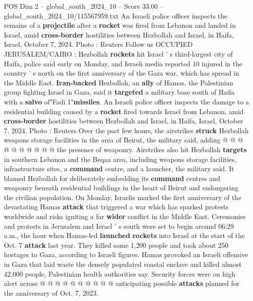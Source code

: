 \begin{textsample}{POS Dim 2 – global\_south\_2024\_10 – Score 33.00 – global\_south\_2024\_10/115567959.txt}  \label{ex:f2_pos_026}
An Israeli police officer inspects the remains of a \textbf{projectile} after a \textbf{rocket} was fired from Lebanon and landed in Israel, amid \textbf{cross-border} hostilities between Hezbollah and Israel, in Haifa, Israel, October 7, 2024.
Photo : Reuters Follow us OCCUPIED JERUSALEM/CAIRO : Hezbollah \textbf{rockets} hit Israel ' s third-largest city of Haifa, police said early on Monday, and Israeli media reported 10 injured in the country ' s north on the first anniversary of the Gaza war, which has spread in the Middle East. \textbf{Iran-backed} Hezbollah, an \textbf{ally} of Hamas, the Palestinian group fighting Israel in Gaza, said it \textbf{targeted} a military base south of Haifa with a \textbf{salvo} of"Fadi 1"\textbf{missiles}.
An Israeli police officer inspects the damage to a residential building caused by a \textbf{rocket} fired towards Israel from Lebanon, amid \textbf{cross-border} hostilities between Hezbollah and Israel, in Haifa, Israel, October 7, 2024.
Photo : Reuters Over the past few hours, the airstrikes \textbf{struck} Hezbollah weapons storage facilities in the area of Beirut, the military said, adding @ @ @ @ @ @ @ @ @ @ the presence of weaponry.
Airstrikes also hit Hezbollah \textbf{targets} in southern Lebanon and the Beqaa area, including weapons storage facilities, infrastructure sites, a \textbf{command} centre, and a launcher, the military said.
It blamed Hezbollah for deliberately embedding its \textbf{command} centres and weaponry beneath residential buildings in the heart of Beirut and endangering the civilian population.
On Monday, Israelis marked the first anniversary of the devastating Hamas \textbf{attack} that triggered a war which has sparked protests worldwide and risks igniting a far \textbf{wider} conflict in the Middle East.
Ceremonies and protests in Jerusalem and Israel ' s south were set to begin around 06:29 a.m., the hour when Hamas-led \textbf{launched} \textbf{rockets} into Israel at the start of the Oct. 7 \textbf{attack} last year.
They killed some 1,200 people and took about 250 hostages to Gaza, according to Israeli figures.
Hamas provoked an Israeli offensive in Gaza that laid waste the densely populated coastal enclave and killed almost 42,000 people, Palestinian health authorities say.
Security forces were on high alert across @ @ @ @ @ @ @ @ @ @ anticipating possible \textbf{attacks} planned for the anniversary of Oct. 7, 2023.

\end{textsample}
